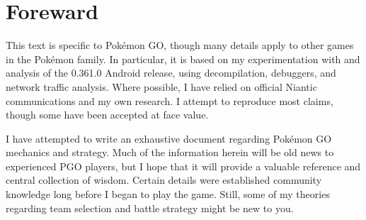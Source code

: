\chapter{Foreward}

This text is specific to Pokémon GO, though many details
apply to other games in the Pokémon family.
In particular, it is based on my experimentation with and analysis of
 the 0.361.0 Android release, using decompilation, debuggers, and
 network traffic analysis.
Where possible, I have relied on official Niantic communications
 and my own research.
I attempt to reproduce most claims, though some have been accepted at face value.

I have attempted to write an exhaustive document regarding Pokémon GO 
 mechanics and strategy.
Much of the information herein will be old news to experienced
 PGO players, but I hope that it will provide a valuable
 reference and central collection of wisdom.
Certain details were established community knowledge long before I
 began to play the game.
Still, some of my theories regarding team selection and battle strategy might
  be new to you.
